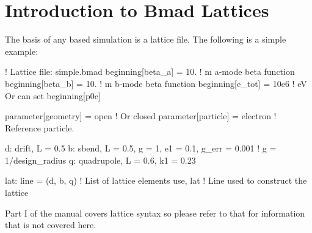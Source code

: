\documentclass{hitec}
\newcommand{\Section}[1]{\section{#1}\vspace*{-1ex}}
\begin{document}
\newpage

\Section{Introduction to Bmad Lattices}
\label{s:bmad.intro}

The basis of any \bmad based simulation is a lattice file. The following is a
simple example:
\begin{code}
! Lattice file: simple.bmad
beginning[beta_a] = 10.   ! m  a-mode beta function
beginning[beta_b] = 10.   ! m  b-mode beta function
beginning[e_tot] = 10e6   ! eV   Or can set beginning[p0c]

parameter[geometry] = open          ! Or closed
parameter[particle] = electron      ! Reference particle.

d: drift, L = 0.5
b: sbend, L = 0.5, g = 1, e1 = 0.1, g_err = 0.001   ! g = 1/design_radius
q: quadrupole, L = 0.6, k1 = 0.23

lat: line = (d, b, q)       ! List of lattice elements
use, lat                    ! Line used to construct the lattice
\end{code}
Part I of the \bmad manual covers lattice syntax so please refer to that for information that
is not covered here.
\end{document}

